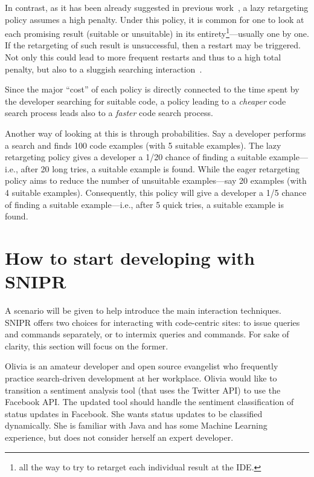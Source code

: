 In contrast, as it has been already suggested in previous work~\cite{Brandt:2009ew, Wightman:2012gc}, a lazy retargeting policy assumes a high penalty. Under this policy, it is common for one to look at each promising result (suitable or unsuitable) in its entirety\footnote{all the way to try to retarget each individual result at the IDE.}---usually one by one. If the retargeting of such result is unsuccessful, then a restart may be triggered. Not only this could lead to more frequent restarts and thus to a high total penalty, but also to a sluggish searching interaction~\cite{Gray:2000im}.

Since the major ``cost'' of each policy is directly connected to the time spent by the developer searching for suitable code, a policy leading to a \emph{cheaper} code search process leads also to a \emph{faster} code search process.

Another way of looking at this is through probabilities. Say a developer performs a search and finds 100 code examples (with 5 suitable examples). The lazy retargeting policy gives a developer a 1/20 chance of finding a suitable example---i.e., after 20 long tries, a suitable example is found. While the eager retargeting policy aims to reduce the number of unsuitable examples---say 20 examples (with 4 suitable examples). Consequently, this policy will give a developer a 1/5 chance of finding a suitable example---i.e., after 5 quick tries, a suitable example is found.


\section{How to start developing with SNIPR}
\label{sec:sniprscenario}

A scenario will be given to help introduce the main interaction techniques. \uppercase{SnipR} offers two choices for interacting with code-centric sites: to issue queries and commands separately, or to intermix queries and commands. For sake of clarity, this section will focus on the former.

Olivia is an amateur developer and open source evangelist who frequently practice search-driven development at her workplace. Olivia would like to transition a sentiment analysis tool (that uses the Twitter API) to use the Facebook API. The updated tool should handle the sentiment classification of status updates in Facebook. She wants status updates to be classified dynamically. She is familiar with Java and has some Machine Learning experience, but does not consider herself an expert developer.

